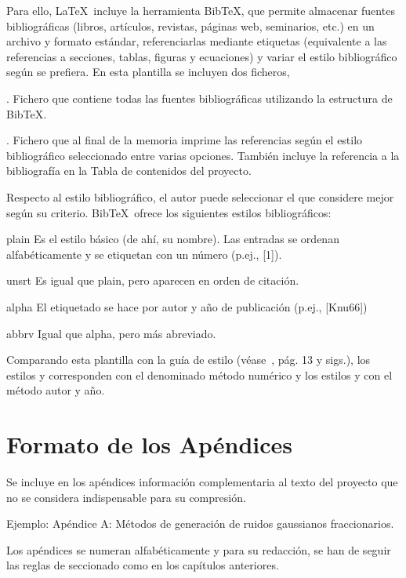 Para ello, \LaTeX\ incluye la herramienta Bib\TeX, que permite almacenar fuentes bibliográficas (libros, artículos, revistas, páginas web, seminarios, etc.) en un archivo y formato estándar, referenciarlas mediante etiquetas (equivalente a las referencias a secciones, tablas, figuras y ecuaciones) y variar el estilo bibliográfico según se prefiera. En esta plantilla se incluyen dos ficheros,
\begin{ite}
	\item {}. Fichero que contiene todas las fuentes bibliográficas utilizando la estructura de Bib\TeX.
	\item {}. Fichero que al final de la memoria  imprime las referencias según el estilo bibliográfico seleccionado entre varias opciones. También incluye la referencia a la bibliografía en la Tabla de contenidos del proyecto.
\end{ite}

Respecto al estilo bibliográfico, el autor puede seleccionar el que considere mejor según su criterio. Bib\TeX\ ofrece los siguientes estilos bibliográficos:
\begin{descript}
	\item[plain] Es el estilo básico (de ahí, su nombre). Las entradas se ordenan alfabéticamente y se etiquetan con un número (p.ej., [1]).
	\item[unsrt] Es igual que plain, pero aparecen en orden de citación.
	\item[alpha] El etiquetado se hace por autor y año de publicación (p.ej., [Knu66])
	\item[abbrv] Igual que alpha, pero más abreviado.
\end{descript}

	Comparando esta plantilla con la guía de estilo (véase~\cite{GuiaEstilo}, pág. 13 y sigs.), los estilos  y  corresponden con el denominado método numérico y los estilos  y  con el método autor y año.

\section{Formato de los Apéndices}
	Se incluye en los apéndices información complementaria al texto del proyecto que no se considera indispensable para su compresión.

	Ejemplo: Apéndice A: Métodos de generación de ruidos gaussianos fraccionarios.

	Los apéndices se numeran alfabéticamente y para su redacción, se han de seguir las reglas de seccionado como en los capítulos anteriores.

